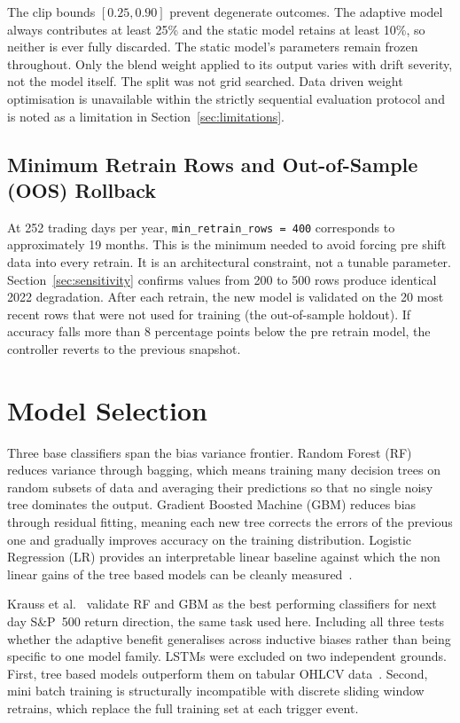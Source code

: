 The clip bounds $[0.25, 0.90]$ prevent degenerate outcomes. The adaptive model always contributes at least 25\% and the static model retains at least 10\%, so neither is ever fully discarded. The static model's parameters remain frozen throughout. Only the blend weight applied to its output varies with drift severity, not the model itself. The split was not grid searched. Data driven weight optimisation is unavailable within the strictly sequential evaluation protocol and is noted as a limitation in Section~\ref{sec:limitations}.

\subsection{Minimum Retrain Rows and Out-of-Sample (OOS) Rollback}
\label{subsec:param_minrows}

At 252 trading days per year, \texttt{min\_retrain\_rows = 400} corresponds to approximately 19 months. This is the minimum needed to avoid forcing pre shift data into every retrain. It is an architectural constraint, not a tunable parameter. Section~\ref{sec:sensitivity} confirms values from 200 to 500 rows produce identical 2022 degradation. After each retrain, the new model is validated on the 20 most recent rows that were not used for training (the out-of-sample holdout). If accuracy falls more than 8 percentage points below the pre retrain model, the controller reverts to the previous snapshot.

\section{Model Selection}
\label{sec:model_selection}

Three base classifiers span the bias variance frontier. Random Forest (RF) reduces variance through bagging, which means training many decision trees on random subsets of data and averaging their predictions so that no single noisy tree dominates the output. Gradient Boosted Machine (GBM) reduces bias through residual fitting, meaning each new tree corrects the errors of the previous one and gradually improves accuracy on the training distribution. Logistic Regression (LR) provides an interpretable linear baseline against which the non linear gains of the tree based models can be cleanly measured~\cite{breiman2001,friedman2001}.

Krauss et al.~\cite{krauss2017} validate RF and GBM as the best performing classifiers for next day S\&P~500 return direction, the same task used here. Including all three tests whether the adaptive benefit generalises across inductive biases rather than being specific to one model family. LSTMs were excluded on two independent grounds. First, tree based models outperform them on tabular OHLCV data~\cite{krauss2017,rapach2013}. Second, mini batch training is structurally incompatible with discrete sliding window retrains, which replace the full training set at each trigger event.

